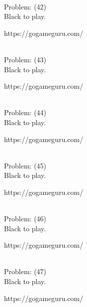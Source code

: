 \documentclass[11pt]{article}
\begin{document}
\begin{minipage}[t]{0.5\textwidth}
  {\centering
  
\\
Problem: (42)\\
Black to play.

https://gogameguru.com/\\
  }
\end{minipage}
\begin{minipage}[t]{0.5\textwidth}
  {\centering
  
\\
Problem: (43)\\
Black to play.

https://gogameguru.com/\\
  }
\end{minipage}
\begin{minipage}[t]{0.5\textwidth}
  {\centering
  
\\
Problem: (44)\\
Black to play.

https://gogameguru.com/\\
  }
\end{minipage}
\begin{minipage}[t]{0.5\textwidth}
  {\centering
  
\\
Problem: (45)\\
Black to play.

https://gogameguru.com/\\
  }
\end{minipage}
\begin{minipage}[t]{0.5\textwidth}
  {\centering
  
\\
Problem: (46)\\
Black to play.

https://gogameguru.com/\\
  }
\end{minipage}
\begin{minipage}[t]{0.5\textwidth}
  {\centering
  
\\
Problem: (47)\\
Black to play.

https://gogameguru.com/\\
  }
\end{minipage}
\end{document}
